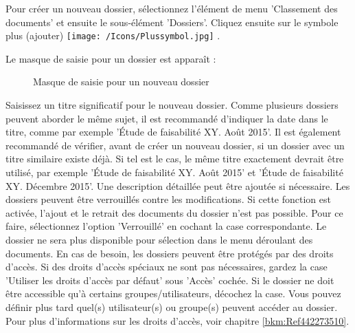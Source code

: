 Pour créer un nouveau dossier, sélectionnez l'élément de menu 'Classement des documents' et ensuite le sous-élément 'Dossiers'. Cliquez ensuite sur le symbole plus (ajouter) \texttt{[image: /Icons/Plussymbol.jpg]} .

\vspace{\baselineskip}

Le masque de saisie pour un dossier est apparaît :

\begin{figure}[H]
\caption{Masque de saisie pour un nouveau dossier}
\end{figure}

Saisissez un titre significatif  pour le nouveau dossier. Comme plusieurs dossiers peuvent aborder le même sujet, il est recommandé d'indiquer la date dans le titre, comme par exemple 'Étude de faisabilité XY. Août 2015'. Il est également recommandé de vérifier, avant de créer un nouveau dossier, si un dossier avec un titre similaire existe déjà. Si tel est le cas, le même titre exactement devrait être utilisé, par exemple 'Étude de faisabilité XY. Août 2015' et 'Étude de faisabilité XY. Décembre 2015'. Une description détaillée  peut être ajoutée si nécessaire. Les dossiers peuvent être verrouillés contre les modifications. Si cette fonction est activée, l'ajout et le retrait des documents du dossier n'est pas possible. Pour ce faire, sélectionnez l'option 'Verrouillé'  en cochant la case correspondante. Le dossier ne sera plus disponible pour sélection dans le menu déroulant des documents. En cas de besoin, les dossiers peuvent être protégés par des droits d'accès. Si des droits d'accès spéciaux ne sont pas nécessaires, gardez la case 'Utiliser les droits d'accès par défaut' sous 'Accès'  cochée. Si le dossier ne doit être accessible qu'à certains groupes/utilisateurs, décochez la case. Vous pouvez définir plus tard quel(s) utilisateur(s) ou groupe(s) peuvent accéder au dossier. Pour plus d'informations sur les droits d'accès, voir chapitre \ref{bkm:Ref442273510}. \newline

